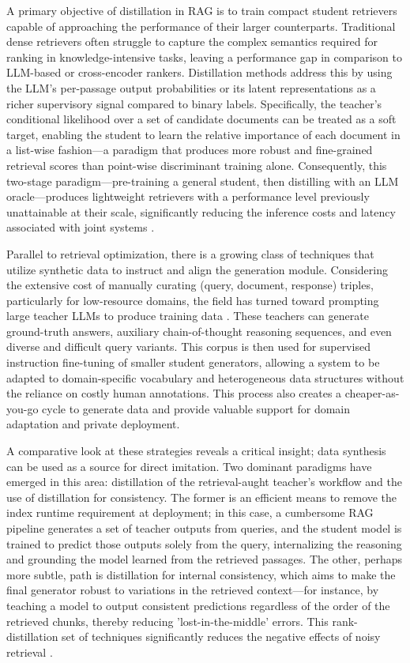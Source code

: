 \documentclass[11pt,a4paper]{article}
\begin{document}
A primary objective of distillation in RAG is to train compact student retrievers capable of approaching the performance of their larger counterparts. Traditional dense retrievers often struggle to capture the complex semantics required for ranking in knowledge-intensive tasks, leaving a performance gap in comparison to LLM-based or cross-encoder rankers. Distillation methods address this by using the LLM's per-passage output probabilities or its latent representations as a richer supervisory signal compared to binary labels. Specifically, the teacher's conditional likelihood over a set of candidate documents can be treated as a soft target, enabling the student to learn the relative importance of each document in a list-wise fashion---a paradigm that produces more robust and fine-grained retrieval scores than point-wise discriminant training alone. Consequently, this two-stage paradigm---pre-training a general student, then distilling with an LLM oracle---produces lightweight retrievers with a performance level previously unattainable at their scale, significantly reducing the inference costs and latency associated with joint systems \cite{arxiv:2405.07437v2,arxiv:2507.18910v1,arxiv:2503.14649v2}.

Parallel to retrieval optimization, there is a growing class of techniques that utilize synthetic data to instruct and align the generation module. Considering the extensive cost of manually curating (query, document, response) triples, particularly for low-resource domains, the field has turned toward prompting large teacher LLMs to produce training data \cite{arxiv:2312.10997v5,arxiv:2504.08893v1,arxiv:2506.00054v1}. These teachers can generate ground-truth answers, auxiliary chain-of-thought reasoning sequences, and even diverse and difficult query variants. This corpus is then used for supervised instruction fine-tuning of smaller student generators, allowing a system to be adapted to domain-specific vocabulary and heterogeneous data structures without the reliance on costly human annotations. This process also creates a cheaper-as-you-go cycle to generate data and provide valuable support for domain adaptation and private deployment.

A comparative look at these strategies reveals a critical insight; data synthesis can be used as a source for direct imitation. Two dominant paradigms have emerged in this area: distillation of the retrieval-aught teacher's workflow and the use of distillation for consistency. The former is an efficient means to remove the index runtime requirement at deployment; in this case, a cumbersome RAG pipeline generates a set of teacher outputs from queries, and the student model is trained to predict those outputs solely from the query, internalizing the reasoning and grounding the model learned from the retrieved passages. The other, perhaps more subtle, path is distillation for internal consistency, which aims to make the final generator robust to variations in the retrieved context---for instance, by teaching a model to output consistent predictions regardless of the order of the retrieved chunks, thereby reducing 'lost-in-the-middle' errors. This rank-distillation set of techniques significantly reduces the negative effects of noisy retrieval \cite{arxiv:2501.07391v1}.
\end{document}

